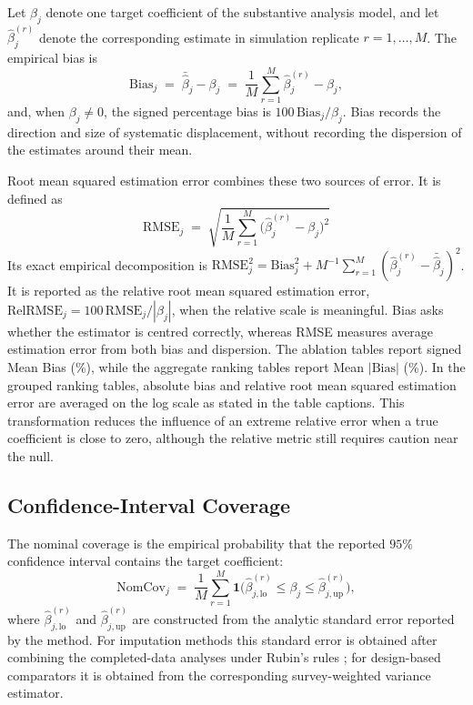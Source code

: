 Let $\beta_j$ denote one target coefficient of the substantive analysis model, and let $\hat{\beta}^{(r)}_j$ denote the corresponding estimate in simulation replicate $r = 1,\ldots,M$. The empirical bias is
\begin{equation}
    \mathrm{Bias}_j
    \;=\; \bar{\hat{\beta}}_j - \beta_j
    \;=\; \frac{1}{M} \sum_{r=1}^{M} \hat{\beta}^{(r)}_j - \beta_j,
    \label{eq:eval_bias}
\end{equation}
and, when $\beta_j \neq 0$, the signed percentage bias is $100\,\mathrm{Bias}_j/\beta_j$. Bias records the direction and size of systematic displacement, without recording the dispersion of the estimates around their mean.

Root mean squared estimation error combines these two sources of error. It is defined as
\begin{equation}
    \mathrm{RMSE}_j
    \;=\; \sqrt{\frac{1}{M} \sum_{r=1}^{M}
    \bigl(\hat{\beta}^{(r)}_j - \beta_j\bigr)^2}
    \label{eq:eval_rmse}
\end{equation}
Its exact empirical decomposition is $\mathrm{RMSE}_j^2 = \mathrm{Bias}_j^2 + M^{-1}\sum_{r=1}^{M}(\hat{\beta}^{(r)}_j-\bar{\hat{\beta}}_j)^2$. It is reported as the relative root mean squared estimation error, $\mathrm{RelRMSE}_j = 100\,\mathrm{RMSE}_j/|\beta_j|$, when the relative scale is meaningful. Bias asks whether the estimator is centred correctly, whereas RMSE measures average estimation error from both bias and dispersion. The ablation tables report signed Mean Bias (\%), while the aggregate ranking tables report Mean $|\mathrm{Bias}|$ (\%). In the grouped ranking tables, absolute bias and relative root mean squared estimation error are averaged on the log scale as stated in the table captions. This transformation reduces the influence of an extreme relative error when a true coefficient is close to zero, although the relative metric still requires caution near the null.

\subsection{Confidence-Interval Coverage}

The nominal coverage is the empirical probability that the reported $95\%$ confidence interval contains the target coefficient:
\begin{equation}
    \mathrm{NomCov}_j
    \;=\; \frac{1}{M} \sum_{r=1}^{M}
    \mathbf{1}\!\bigl(
        \hat{\beta}_{j,\mathrm{lo}}^{(r)}
        \leq \beta_j \leq
        \hat{\beta}_{j,\mathrm{up}}^{(r)}
    \bigr),
    \label{eq:eval_coverage}
\end{equation}
where $\hat{\beta}_{j,\mathrm{lo}}^{(r)}$ and $\hat{\beta}_{j,\mathrm{up}}^{(r)}$ are constructed from the analytic standard error reported by the method. For imputation methods this standard error is obtained after combining the completed-data analyses under Rubin's rules \citep{Rubin1987}; for design-based comparators it is obtained from the corresponding survey-weighted variance estimator.

